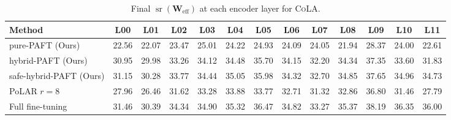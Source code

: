 \begin{table}[t]
\centering
\small
\setlength{\tabcolsep}{3pt}
\caption{Final $\operatorname{sr}(\mathbf{W}_{\text{eff}})$ at each encoder layer for \textsc{CoLA}.}
\label{tab:per_layer_cola}
\begin{tabular}{lcccccccccccc}
\toprule
\textbf{Method} & \textbf{L00} & \textbf{L01} & \textbf{L02} & \textbf{L03} & \textbf{L04} & \textbf{L05} & \textbf{L06} & \textbf{L07} & \textbf{L08} & \textbf{L09} & \textbf{L10} & \textbf{L11} \\
\midrule
pure-PAFT (Ours) & 22.56 & 22.07 & 23.47 & 25.01 & 24.22 & 24.93 & 24.09 & 24.05 & 21.94 & 28.37 & 24.00 & 22.61 \\
hybrid-PAFT (Ours) & 30.95 & 29.98 & 33.26 & 34.12 & 34.48 & 35.70 & 34.15 & 32.20 & 34.34 & 37.35 & 33.60 & 31.83 \\
safe-hybrid-PAFT (Ours) & 31.15 & 30.28 & 33.77 & 34.44 & 35.05 & 35.98 & 34.32 & 32.70 & 34.85 & 37.65 & 34.96 & 34.73 \\
PoLAR $r{=}8$ & 27.96 & 26.46 & 31.62 & 33.28 & 33.88 & 33.77 & 32.71 & 31.32 & 32.86 & 36.80 & 31.46 & 27.79 \\
Full fine-tuning & 31.46 & 30.39 & 34.34 & 34.90 & 35.32 & 36.47 & 34.82 & 33.27 & 35.37 & 38.19 & 36.35 & 36.00 \\
\bottomrule
\end{tabular}
\end{table}